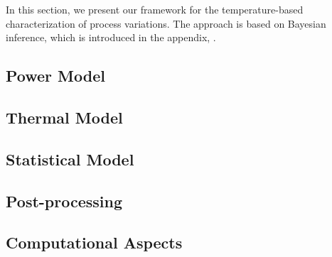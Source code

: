 In this section, we present our framework for the temperature-based characterization of process variations. The approach is based on Bayesian inference, which is introduced in the appendix, .

\subsection{Power Model} 


\subsection{Thermal Model} 


\subsection{Statistical Model} 


\subsection{Post-processing} 


\subsection{Computational Aspects} 

